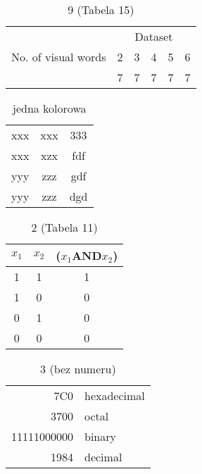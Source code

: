 \documentclass{article}
\begin{document}
		
\begin{table}
\begin{center}
			\begin{tabular}{|c|c|c|c|c|c|}
			\hline
			\multirow{3}{*}{No. of visual words} & \multicolumn{5}{c|}{Dataset} \\ \cline{2-6}
			  & 2 & 3 & 4 & 5 & 6 \\ \hline
			  & 7 & 7 & 7 & 7 & 7 \\ \hline
			
\end{tabular}
\caption{9 (Tabela 15)}
\end{center}
\end{table}


\begin{table}
\begin{center}
\begin{tabular}{ccc}
xxx & xxx & 333 \\
xxx & xzx & fdf \\
yyy & zzz & gdf \\
yyy & zzz & dgd \\
\end{tabular}
\caption{jedna kolorowa}

\end{center}
\end{table}

\begin{table}
\begin{center}
\begin{tabular}{c|c|c}
\hline
\hline 
$x_{1}$ & $x_{2}$ & ($x_{1}$AND$x_{2}$)  \\ \hline
1 & 1 & 1 \\ 
1 & 0 & 0 \\
0 & 1 & 0 \\
0 & 0 & 0 \\
\hline \hline
\end{tabular}
\caption{2 (Tabela 11)}
\end{center}
\end{table}

\begin{table}
\begin{center}
\begin{tabular}{|r|l|}
\hline
7C0 & hexadecimal \\
3700 & octal \\ \cline{2-2}
11111000000 & binary \\ 
\hline
\hline 
1984 & decimal \\ \hline
\end{tabular}
\caption{3 (bez numeru)}
\end{center}
\end{table}
\end{document}
